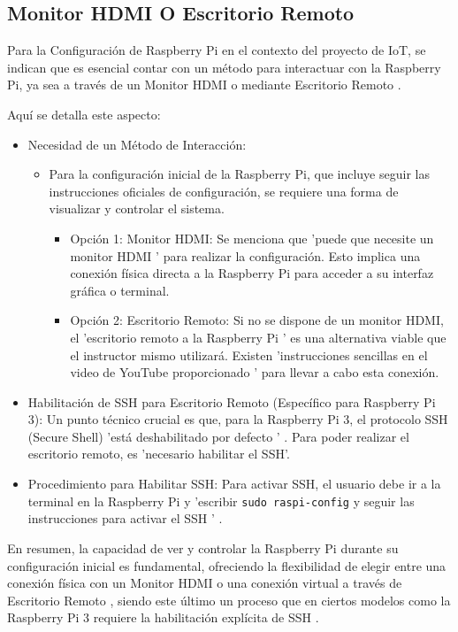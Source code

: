\documentclass{report}
\begin{document}
\subsection{Monitor HDMI O Escritorio Remoto}
Para la  Configuración de Raspberry Pi  en el contexto del proyecto de IoT, se  indican que es esencial contar con un método para interactuar 
con la Raspberry Pi, ya sea a través de un  Monitor HDMI  o mediante  Escritorio Remoto .

Aquí se detalla este aspecto:
\begin{itemize}
    \item Necesidad de un Método de Interacción:  
    \begin{itemize}
        \item Para la configuración inicial de la Raspberry Pi, que incluye seguir las instrucciones oficiales de configuración, se requiere una forma 
        de visualizar y controlar el sistema.
        \begin{itemize}
            \item Opción 1: Monitor HDMI:  Se menciona que   'puede que necesite un monitor HDMI '  para realizar la configuración. Esto implica 
            una conexión física directa a la Raspberry Pi para acceder a su interfaz gráfica o terminal.
            \item Opción 2: Escritorio Remoto:  Si no se dispone de un monitor HDMI, el   'escritorio remoto a la Raspberry Pi '  es una alternativa 
            viable que el instructor mismo utilizará. Existen  'instrucciones sencillas en el video de YouTube proporcionado ' para llevar a cabo esta 
            conexión.
        \end{itemize}
    \end{itemize}
    \item Habilitación de SSH para Escritorio Remoto (Específico para Raspberry Pi 3):  Un punto técnico crucial es que, para la Raspberry Pi 3, el 
    protocolo SSH (Secure Shell)   'está deshabilitado por defecto ' . Para poder realizar el escritorio remoto, es 'necesario habilitar el SSH'.
    \item Procedimiento para Habilitar SSH:  Para activar SSH, el usuario debe ir a la terminal en la Raspberry Pi y 'escribir \verb|sudo raspi-config| y 
    seguir las instrucciones para activar el SSH ' .
\end{itemize}
En resumen, la capacidad de ver y controlar la Raspberry Pi durante su configuración inicial es fundamental, ofreciendo la flexibilidad de elegir entre 
una conexión física con un  Monitor HDMI  o una conexión virtual a través de  Escritorio Remoto , siendo este último un proceso que en ciertos modelos 
como la Raspberry Pi 3 requiere la  habilitación explícita de SSH .
\end{document}
